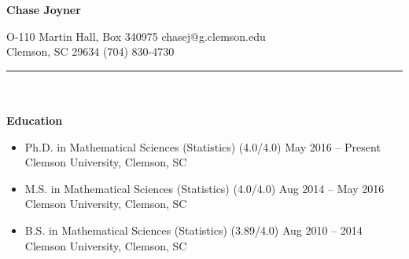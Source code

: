 \documentclass[10pt]{article}
\begin{document}
\begin{center}
{\Large \textbf{Chase Joyner}}
\end{center}
O-110 Martin Hall, Box 340975 \hfill chasej@g.clemson.edu \\
Clemson, SC 29634 \hfill (704) 830-4730 \\
\rule{18.08cm}{0.20mm} \\ \\
\noindent
\textbf{Education}
\vspace{-0.25cm}
\begin{itemize}
\item[] Ph.D. in Mathematical Sciences (Statistics) (4.0/4.0) \hfill May 2016 -- Present \\
Clemson University, Clemson, SC
\item[] M.S. in Mathematical Sciences (Statistics) (4.0/4.0) \hfill Aug 2014 -- May 2016 \\
Clemson University, Clemson, SC
\item[] B.S. in Mathematical Sciences (Statistics) (3.89/4.0) \hfill Aug 2010 -- 2014 \\
Clemson University, Clemson, SC
\end{itemize}
\end{document}
